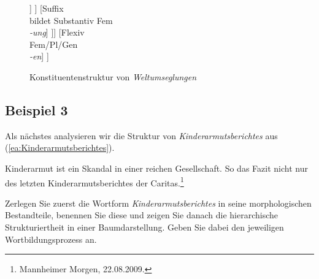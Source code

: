 \begin{figure}
	\centering
	\begin{forest}
		[Bildung: Flexion\\Substantiv Fem/Pl/Gen\\ \textit{Weltumseglungen} [Bildung: Komposition\\Stammform\\Substantiv Fem\\ \textit{Weltumseglung} [Kompositionsstammform\\Substantiv Fem\\ \textit{welt}] [Stammform\\Substantiv Fem\\ \textit{Umseglung} [Derivationsstammform\\Verb\\ \textit{umsegel} [Bildung: Derivation\\Stammform\\ Verb\\ \textit{umsegel} [Präfix\\formt Verb\\ \textit{um-}] [Derivationsstammform\\Verb\\ \textit{segel}] ] ] [Suffix\\bildet Substantiv Fem\\ \textit{-ung}]  ]] [Flexiv\\ Fem/Pl/Gen \\ \textit{-en}] ]
	\end{forest}
	\caption{Konstituentenstruktur von \textit{Weltumseglungen} }\label{caption:Weltumseglungen}
\end{figure}



\subsection{Beispiel 3}\label{subsection:Bsp3Wb}

Als nächstes analysieren wir die Struktur von \textit{Kinderarmutsberichtes} aus (\ref{ea:Kinderarmutsberichtes}).

\ea \label{ea:Kinderarmutsberichtes} Kinderarmut ist ein Skandal in einer reichen Gesellschaft. So das Fazit nicht nur des letzten Kinderarmutsberichtes der Caritas.\footnote{Mannheimer Morgen, 22.08.2009.}
\z 

Zerlegen Sie zuerst die Wortform \textit{Kinderarmutsberichtes} in seine morphologischen Bestandteile, benennen Sie diese und zeigen Sie danach die hierarchische Strukturiertheit in einer Baumdarstellung. Geben Sie dabei den jeweiligen Wortbildungsprozess an.


